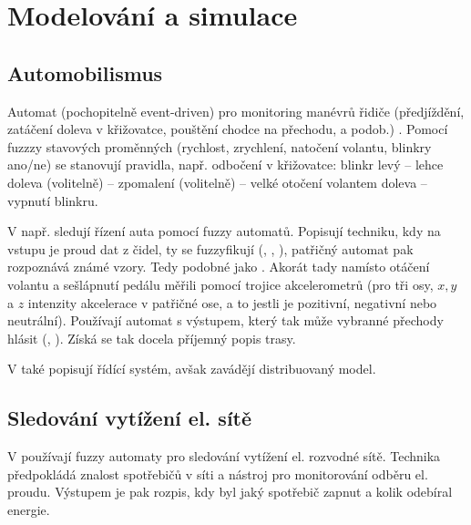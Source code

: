 \documentclass[a4paper,10pt]{article}
\begin{document}
\section{Modelování a simulace}


\subsection{Automobilismus}
Automat (pochopitelně event-driven) pro monitoring manévrů řidiče (předjíždění, zatáčení doleva v křižovatce, pouštění chodce na přechodu, a podob.) \cite{Hul+-ManRecUsProFinStaMacFuzLog}. Pomocí fuzzzy stavových proměnných (rychlost, zrychlení, natočení volantu, blinkry ano/ne) se stanovují pravidla, např. odbočení v křižovatce: blinkr levý -- lehce doleva (volitelně) -- zpomalení (volitelně) -- velké otočení volantem doleva -- vypnutí blinkru.

V \cite{TriHei-ExpDesSeqFuzPer} např. sledují řízení auta pomocí fuzzy automatů. Popisují techniku, kdy na vstupu je proud dat z čidel, ty se fuzzyfikují (, , ), patřičný automat pak rozpoznává známé vzory. Tedy podobné jako \cite{Hul+-ManRecUsProFinStaMacFuzLog}. Akorát tady namísto otáčení volantu a sešlápnutí pedálu měřili pomocí trojice akcelerometrů (pro tři osy, $x, y$ a $z$ intenzity akcelerace v patřičné ose, a to jestli je pozitivní, negativní nebo neutrální). Používají automat s výstupem, který tak může vybranné přechody hlásit (, ). Získá se tak docela příjemný popis trasy.

V \cite{GraFod-FuzAutIntHybConSys} také popisují řídící systém, avšak zavádějí distribuovaný model.

\subsection{Sledování vytížení el. sítě}
V \cite{DucMarMar-AlgBasFiStMacFuzTrNoIntrLoaDis} používají fuzzy automaty pro sledování vytížení el. rozvodné sítě. Technika předpokládá znalost spotřebičů v síti a nástroj pro monitorování odběru el. proudu. Výstupem je pak rozpis, kdy byl jaký spotřebič zapnut a kolik odebíral energie.
\end{document}
